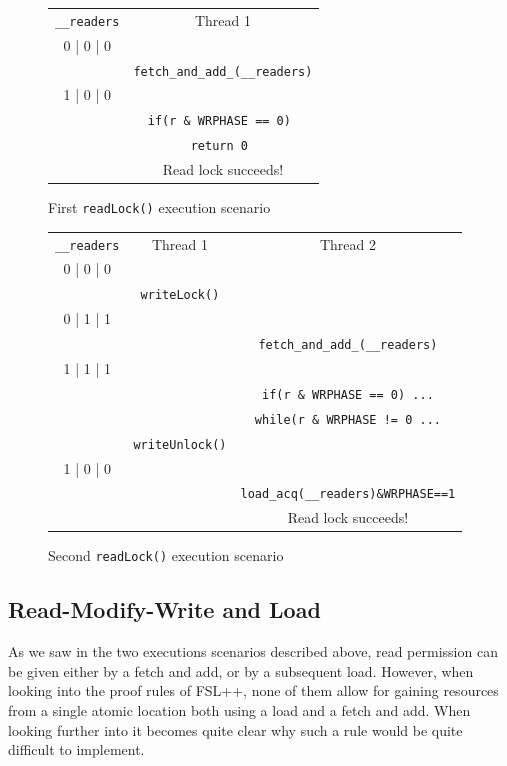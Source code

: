 \begin{figure}
\begin{tabular}{c||c}
	\texttt{\_\_readers} & Thread 1\\
	0 | 0 | 0 & \\
	 &   \texttt{fetch\_and\_add\_(\_\_readers)} \\
	1 | 0 | 0 & \\
	 & \texttt{if(r \& WRPHASE == 0) } \\
	& \texttt{return 0 } \\
	&  Read lock succeeds!
\end{tabular}

		\caption{First \texttt{readLock()} execution scenario}
		\label{fig:scen1}
\end{figure}
\begin{figure}
\begin{tabular}{c||c|c}
	\texttt{\_\_readers} & Thread 1 & Thread 2 \\
	0 | 0 | 0 & & \\
	 & \texttt{writeLock()} & \\
	0 | 1 | 1 &   & \\
	 &   & \texttt{fetch\_and\_add\_(\_\_readers)} \\
	1 | 1 | 1 & & \\
		& & \texttt{if(r \& WRPHASE == 0) ...} \\
		& & \texttt{while(r \& WRPHASE != 0 ...} \\
	 & \texttt{writeUnlock()} & \\
		1 | 0 | 0 & & \\
		& & \texttt{load\_acq(\_\_readers)\&WRPHASE==1} \\
		& & Read lock succeeds!
\end{tabular}

		\caption{Second \texttt{readLock()} execution scenario}
		\label{fig:scen2}
\end{figure}


		\subsection{Read-Modify-Write and Load}
	\label{subsec:glibcRWPb}
As we saw in the two executions scenarios described above, read permission can be given either by a fetch and add, or by a subsequent load. However, when looking into the proof rules of FSL++, none of them allow for gaining resources from a single atomic location both using a load and a fetch and add. When looking further into it becomes quite clear why such a rule would be quite difficult to implement.

